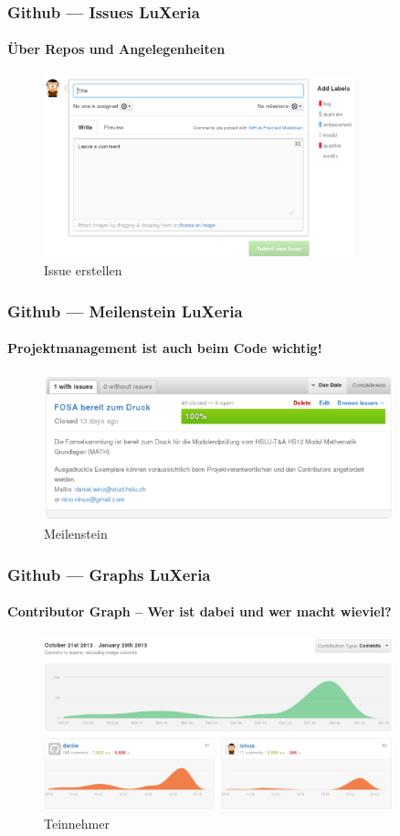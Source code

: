 \begin{frame}
	\frametitle{Github --- Issues \hfill{} LuXeria}
	\framesubtitle{Über Repos und Angelegenheiten}
	\begin{figure}
		\includegraphics[width=0.8\textwidth]{github_issue.pdf}
		\caption{Issue erstellen}
	\end{figure}
\end{frame}

\begin{frame}
	\frametitle{Github --- Meilenstein \hfill{} LuXeria}
	\framesubtitle{Projektmanagement ist auch beim Code wichtig!}
	\begin{figure}
		\includegraphics[width=0.9\textwidth]{github_milestone.pdf}
		\caption{Meilenstein}
	\end{figure}
\end{frame}

\begin{frame}
	\frametitle{Github --- Graphs \hfill{} LuXeria}
	\framesubtitle{Contributor Graph -- Wer ist dabei und wer macht wieviel?}
	\begin{figure}
		\includegraphics[width=0.9\textwidth]{github_contributors.pdf}
		\caption{Teinnehmer}
	\end{figure}
\end{frame}

